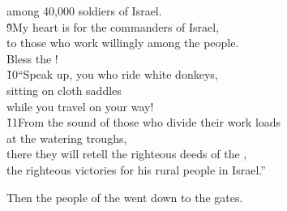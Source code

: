 \begin{poetry}
\poemll    among 40,000 soldiers of Israel. \\
\poeml \v{9}My heart is for the commanders of Israel, \\
\poemll    to those who work willingly among the people. \\
\poemlll       Bless the ! \\
\poeml \v{10}``Speak up, you who ride white donkeys, \\
\poemll    sitting on cloth saddles \\
\poemlll       while you travel on your way! \\
\poeml \v{11}From the sound of those who divide their work loads \\
\poemll    at the watering troughs, \\
\poeml there they will retell the righteous deeds of the , \\
\poemll    the righteous victories for his rural people in Israel.''
\end{poetry}

Then the people of the  went down to the gates.

